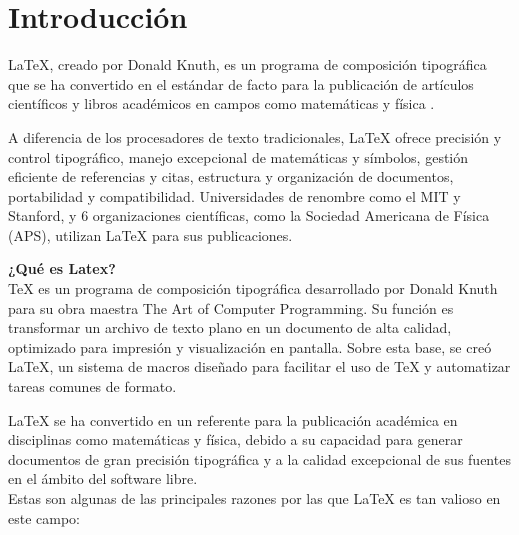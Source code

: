 \documentclass[10pt,twocolumn]{article}
\begin{document}

    \section{Introducción}
    LaTeX, creado por Donald Knuth, es un programa de composición tipográfica que se ha convertido en el estándar de facto para la publicación de artículos científicos y libros académicos en campos como matemáticas y física \parencite{knuth1997art}.

    A diferencia de los procesadores de texto tradicionales, LaTeX ofrece precisión y control tipográfico, manejo excepcional de matemáticas y símbolos, gestión eficiente de referencias y citas, estructura y organización de documentos, portabilidad y compatibilidad. 
    Universidades de renombre como el MIT y Stanford, y 6 organizaciones científicas, como la Sociedad Americana de Física (APS), utilizan LaTeX para sus publicaciones.

\textbf{¿Qué es Latex?}\\
TeX es un programa de composición tipográfica desarrollado por Donald Knuth para su obra maestra The Art of Computer Programming. 
Su función es transformar un archivo de texto plano en un documento de alta calidad, optimizado para impresión y visualización en pantalla. \textcite{poley2000latex} 
Sobre esta base, se creó LaTeX, un sistema de macros diseñado para facilitar el uso de TeX y automatizar tareas comunes de formato.

LaTeX se ha convertido en un referente para la publicación académica en disciplinas como matemáticas y física, debido a su capacidad para generar documentos de gran precisión tipográfica y a la calidad excepcional de sus fuentes en el ámbito del software libre.\\
Estas son algunas de las principales razones por las que LaTeX es tan valioso en este campo:
\end{document}
